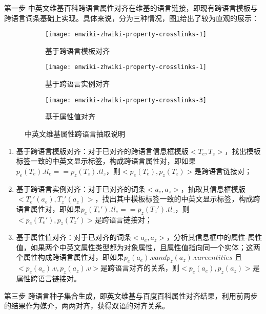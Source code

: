{\heiti 第一步 中英文维基百科跨语言属性对齐}在维基的语言链接，即现有跨语言模板与跨语言词条基础上实现。具体来说，分为三种情况，图\ref{fig:cross-lingual-seed}给出了较为直观的展示：

\begin{figure}[h]
  \centering%
  \begin{subfigure}{0.48\textwidth}
    \centering
    \texttt{[image: enwiki-zhwiki-property-crosslinks-1]}
    \caption{基于跨语言模板对齐}
  \end{subfigure}%
  \hspace{0.01cm}%
  \begin{subfigure}{0.48\textwidth}
    \centering
    \texttt{[image: enwiki-zhwiki-property-crosslinks-1]}%
    \caption{基于跨语言实例对齐}
  \end{subfigure}
  \vspace{0.01cm}%
  \begin{subfigure}{0.5\textwidth}
    \centering
    \texttt{[image: enwiki-zhwiki-property-crosslinks-3]}
    \caption{基于属性值对齐}
  \end{subfigure}
  \caption{中英文维基属性跨语言抽取说明}
  \label{fig:cross-lingual-seed}
\end{figure}

\begin{enumerate}[1)]
\item  {\heiti 基于跨语言模版对齐：}对于已对齐的跨语言信息框模版$<T_e, T_z>$，找出模板标签一致的中英文显示标签，构成跨语言属性对，即如果$p_e(T_e).tl_e == p_z(T_z).tl_z$，则$<p_e(T_e), p_z(T_z)>$是跨语言链接对；
\item  {\heiti 基于跨语言实例对齐：}对于已对齐的词条$<a_e, a_z>$，抽取其信息框模版$<T_e'(a_e), T_z'(a_z)>$，找出其中模板标签一致的中英文显示标签，构成跨语言属性对，即如果$p_e(T_e').tl_e == p_z(T_z').tl_z$，则$<p_e(T_e'), p_z(T_z')>$是跨语言链接对；
\item  {\heiti 基于属性值对齐：}对于已对齐的词条$<a_e, a_z>$，分析其信息框中的属性-属性值，如果两个中英文属性类型都为对象属性，且属性值指向同一个实体；这两个属性构成跨语言属性对，即如果$p_e(a_e).v and p_z(a_z).v are entities$ 且 $<p_e(a_e).v, p_z(a_z).v>$是跨语言对齐的关系，则$<p_e(a_e), p_z(a_z)>$是属性跨语言链接对。
\end{enumerate}

{\heiti 第三步 跨语言种子集合生成}，即英文维基与百度百科属性对齐结果，利用前两步的结果作为媒介，两两对齐，获得双语的对齐关系。

